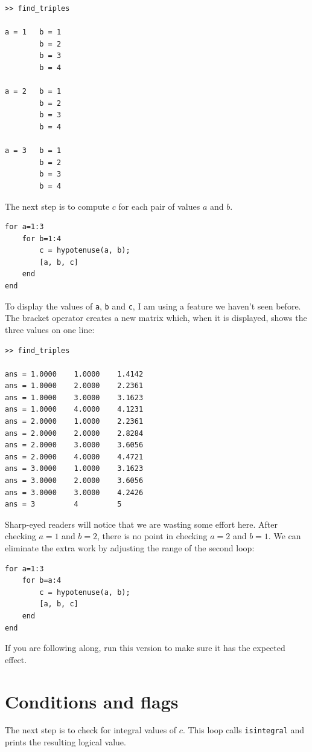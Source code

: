\documentclass{book}
\begin{document}
\begin{verbatim}
>> find_triples

a = 1   b = 1
        b = 2
        b = 3
        b = 4

a = 2   b = 1
        b = 2
        b = 3
        b = 4

a = 3   b = 1
        b = 2
        b = 3
        b = 4
\end{verbatim}

The next step is to compute $c$ for each pair of values $a$ and $b$.

\begin{verbatim}
for a=1:3
    for b=1:4
        c = hypotenuse(a, b);
        [a, b, c]
    end
end
\end{verbatim}

To display the values of {\tt a}, {\tt b} and {\tt c}, I am
using a feature we haven't seen before.  The bracket operator
creates a new matrix which, when it is displayed, shows the
three values on one line:

\begin{verbatim}
>> find_triples

ans = 1.0000    1.0000    1.4142
ans = 1.0000    2.0000    2.2361
ans = 1.0000    3.0000    3.1623
ans = 1.0000    4.0000    4.1231
ans = 2.0000    1.0000    2.2361
ans = 2.0000    2.0000    2.8284
ans = 2.0000    3.0000    3.6056
ans = 2.0000    4.0000    4.4721
ans = 3.0000    1.0000    3.1623
ans = 3.0000    2.0000    3.6056
ans = 3.0000    3.0000    4.2426
ans = 3         4         5
\end{verbatim}

Sharp-eyed readers will notice that we are wasting some effort here.
After checking $a=1$ and $b=2$, there is no point in checking
$a=2$ and $b=1$.  We can eliminate the extra work by adjusting the
range of the second loop:

\begin{verbatim}
for a=1:3
    for b=a:4
        c = hypotenuse(a, b);
        [a, b, c]
    end
end
\end{verbatim}

If you are following along, run this version to make sure it has
the expected effect.


\section{Conditions and flags}

The next step is to check for integral values of $c$.  This
loop calls {\tt isintegral} and prints the resulting logical
value.
\end{document}

